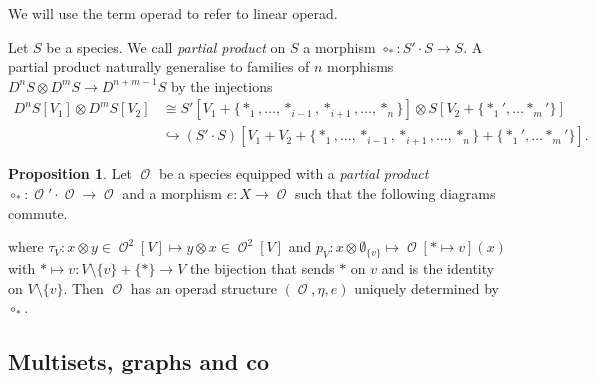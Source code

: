 \documentclass[a4paper]{article}
\DeclareMathOperator{\id}{id}
\DeclareMathOperator{\op}{\mathcal{O}}
\theoremstyle{definition}
\newtheorem{proposition}[definition]{Proposition}
\begin{document}
We will use the term operad to refer to linear operad.

Let $S$ be a species. We call \textit{partial product} on $S$ a morphism $\circ_{\ast} :S'\cdot S \rightarrow S$. A partial product naturally generalise to families of $n$ morphisms $D^nS\otimes D^mS \rightarrow D^{n+m-1}S$ by the injections
\begin{align*}
D^nS[V_1]\otimes D^mS[V_2] &\cong S'[V_1+\{\ast_1,\dots,\ast_{i-1},\ast_{i+1},\dots,\ast_n\}]\otimes S[V_2+\{\ast_1',\dots\ast_m'\}] \\
&\hookrightarrow (S'\cdot S)[V_1+V_2+\{\ast_1,\dots, \ast_{i-1},\ast_{i+1},\dots,\ast_n\} + \{\ast_1',\dots\ast_m'\}].
\end{align*} 

\begin{proposition}
\label{pp}
Let $\op$ be a species equipped with a \textit{partial product} $\circ_{\ast}:\op'\cdot\op\rightarrow \op$ and a morphism $e:X \rightarrow \op$ such that the following diagrams commute.
\begin{center}
\end{center}
\begin{center}
\end{center}
where $\tau_V:x\otimes y\in \op^2[V] \mapsto y\otimes x\in \op^2[V]$ and $p_V: x\otimes \emptyset_{\{v\}} \mapsto \op[\ast\mapsto v](x)$ with $\ast\mapsto v: V\setminus\{v\} + \{\ast\}\rightarrow V$ the bijection that sends $\ast$ on $v$ and is the identity on $V\setminus\{v\}$.
Then $\op$ has an operad structure $(\op,\eta,e)$ uniquely determined by $\circ_{\ast}$.
\end{proposition}


\subsection{Multisets, graphs and co}
\end{document}
